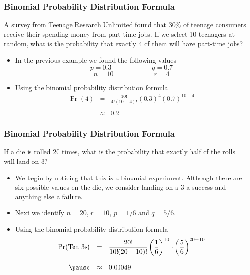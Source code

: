 \documentclass[Lecture.tex]{subfiles}
\begin{document}
\begin{frame}
\frametitle{Binomial Probability Distribution Formula}\pause
\begin{example}
A survey from Teenage Research Unlimited found that $30 \%$ of
teenage consumers receive their spending money from part-time jobs.
If we select 10 teenagers at random, what is the probability that exactly 4 of them will have part-time jobs?
\end{example}
\begin{itemize}
\item In the previous example we found the following values
$$p=0.3\qquad\qquad\qquad q=0.7$$
$$n=10\qquad\qquad\qquad r=4$$\pause
\vspace*{-.1in}
\item Using the binomial probability distribution formula
$$\begin{array}{rcl}
\displaystyle \Pr(4)
&=&\displaystyle\frac{10!}{4!(10-4)!}(0.3)^4(0.7)^{10-4}\\ \\
&\approx&\displaystyle 0.2
\end{array}$$
\end{itemize}
\end{frame}

\begin{frame}
\frametitle{Binomial Probability Distribution Formula}\pause
\begin{example}
If a die is rolled 20 times, what is the probability that exactly half of the rolls will land on 3?
\end{example}\pause
\begin{itemize}
\item We begin by noticing that this is a binomial experiment.  Although there are six possible values on the die, we consider landing on a 3 a success and anything else a failure.\pause
\item Next we identify $n=20$, $r=10$, $p=1/6$ and $q=5/6$.\pause
\item Using the binomial probability distribution formula
$$\begin{array}{rcl}
\displaystyle \Pr(\text{Ten 3s})
&=&\displaystyle\frac{20!}{10!(20-10)!}\left(\frac{1}{6}\right)^{10}\cdot\left(\frac{5}{6}\right)^{20-10}\\ \\ \pause
&\approx&0.00049
\end{array}$$
\end{itemize}
\end{frame}
\end{document}
